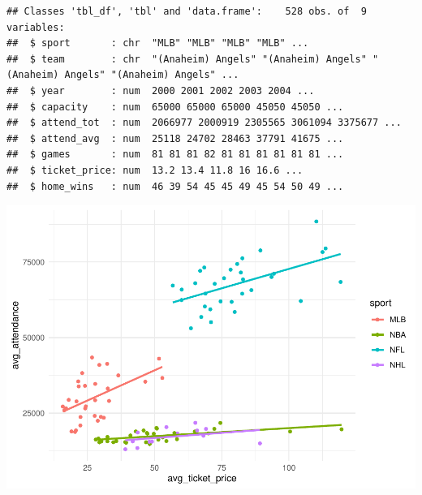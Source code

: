 \documentclass[man]{apa6}
\newenvironment{Shaded}{\begin{snugshade}}{\end{snugshade}}
\newcommand{\DataTypeTok}[1]{\textcolor[rgb]{0.13,0.29,0.53}{#1}}
\newcommand{\DecValTok}[1]{\textcolor[rgb]{0.00,0.00,0.81}{#1}}
\newcommand{\KeywordTok}[1]{\textcolor[rgb]{0.13,0.29,0.53}{\textbf{#1}}}
\newcommand{\NormalTok}[1]{#1}
\newcommand{\OperatorTok}[1]{\textcolor[rgb]{0.81,0.36,0.00}{\textbf{#1}}}
\newcommand{\OtherTok}[1]{\textcolor[rgb]{0.56,0.35,0.01}{#1}}
\newcommand{\StringTok}[1]{\textcolor[rgb]{0.31,0.60,0.02}{#1}}
\begin{document}
\begin{verbatim}
## Classes 'tbl_df', 'tbl' and 'data.frame':    528 obs. of  9 variables:
##  $ sport       : chr  "MLB" "MLB" "MLB" "MLB" ...
##  $ team        : chr  "(Anaheim) Angels" "(Anaheim) Angels" "(Anaheim) Angels" "(Anaheim) Angels" ...
##  $ year        : num  2000 2001 2002 2003 2004 ...
##  $ capacity    : num  65000 65000 65000 45050 45050 ...
##  $ attend_tot  : num  2066977 2000919 2305565 3061094 3375677 ...
##  $ attend_avg  : num  25118 24702 28463 37791 41675 ...
##  $ games       : num  81 81 81 82 81 81 81 81 81 81 ...
##  $ ticket_price: num  13.2 13.4 11.8 16 16.6 ...
##  $ home_wins   : num  46 39 54 45 45 49 45 54 50 49 ...
\end{verbatim}

\begin{Shaded}
\end{Shaded}

\includegraphics{Final_Project_files/figure-latex/tidy-1.pdf}
\end{document}
